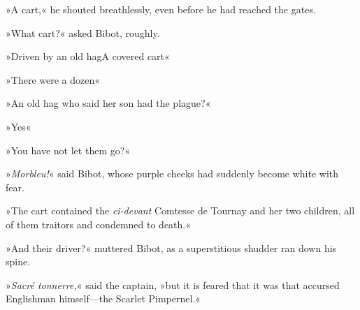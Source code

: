 »A cart,\textellipsis« he shouted breathlessly, even before he had reached the gates.

»What cart?« asked Bibot, roughly.

»Driven by an old hag\textellipsis \allowbreak  A covered cart\textellipsis«

»There were a dozen\textellipsis«

»An old hag who said her son had the plague?«

»Yes\textellipsis«

»You have not let them go?«

»\textit{Morbleu!}« said Bibot, whose purple cheeks had suddenly become white with fear.

»The cart contained the \textit{ci-devant} Comtesse de Tournay and her two children, all of them traitors and condemned to death.«

»And their driver?« muttered Bibot, as a superstitious shudder ran down his spine.

»\textit{Sacré tonnerre,}« said the captain, »but it is feared that it was that accursed Englishman himself—the Scarlet Pimpernel.«